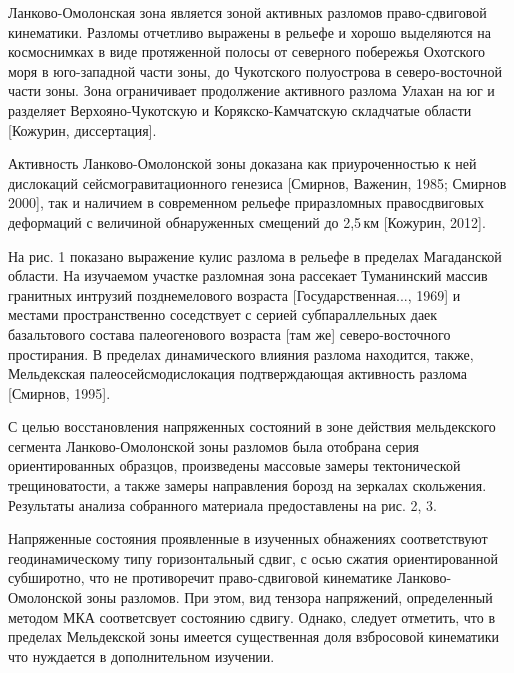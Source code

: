 



\makeProcTitleII



Ланково-Омолонская зона является зоной активных разломов право-сдвиговой
кинематики. Разломы отчетливо выражены в рельефе и хорошо выделяются на космоснимках
в виде протяженной полосы от северного побережья Охотского моря в юго-западной
части зоны, до Чукотского полуострова в северо-восточной части зоны.
Зона ограничивает продолжение активного разлома Улахан на юг и разделяет
Верхояно-Чукотскую и Корякско-Камчатскую складчатые области [Кожурин, диссертация].


Активность Ланково-Омолонской зоны доказана как приуроченностью к ней
дислокаций сейсмогравитационного генезиса [Смирнов, Важенин, 1985; Смирнов
2000], так и наличием в современном рельефе приразломных правосдвиговых деформаций
с величиной обнаруженных смещений до 2,5\,км [Кожурин, 2012].

На рис. 1 показано выражение кулис разлома в рельефе в пределах Магаданской области.
На изучаемом участке разломная зона рассекает Туманинский массив
гранитных интрузий позднемелового возраста [Государственная..., 1969]
и местами пространственно соседствует с серией субпараллельных даек
базальтового состава палеогенового возраста [там же] северо-восточного простирания.
В пределах динамического влияния разлома находится, также, Мельдекская
палеосейсмодислокация подтверждающая активность разлома [Смирнов, 1995].



С целью восстановления напряженных состояний в зоне действия мельдекского
сегмента Ланково-Омолонской зоны разломов была отобрана серия ориентированных
образцов, произведены массовые замеры тектонической трещиноватости, а также
замеры направления борозд  на зеркалах скольжения.
Результаты анализа собранного материала предоставлены на рис. 2, 3.


\clearpage
Напряженные состояния проявленные в изученных обнажениях соответствуют
геодинамическому типу горизонтальный сдвиг, с осью сжатия ориентированной
субширотно, что не противоречит право-сдвиговой кинематике Ланково-Омолонской
зоны разломов. При этом, вид тензора напряжений, определенный методом МКА
соответсвует состоянию сдвигу. Однако, следует отметить, что в пределах
Мельдекской зоны имеется существенная доля взбросовой кинематики что нуждается
в дополнительном изучении.





